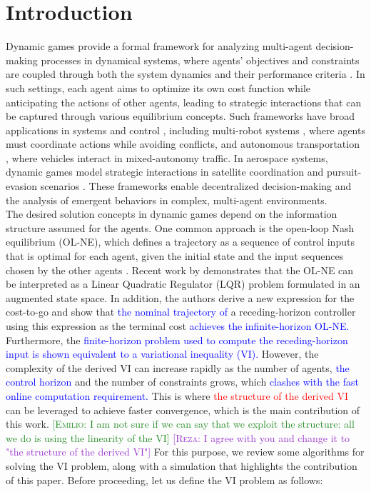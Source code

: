 \documentclass[letterpaper, 10 pt, conference]{ieeeconf}  %
\newcommand{\edit}[1]{\textcolor{blue}{#1}}
\newcommand{\emiliosay}[1]{\textcolor{ForestGreen}{[\textsc{Emilio:} #1]}}
\newcommand{\rezasay}[1]{\textcolor{DarkOrchid}{[\textsc{Reza:} #1]}}
\newcommand{\red}[1]{\textcolor{red}{#1}}
\begin{document}
\section{Introduction}
Dynamic games provide a formal framework for analyzing multi-agent decision-making processes in dynamical systems, where agents' objectives and constraints are coupled through both the system dynamics and their performance criteria \cite{haurie2012games,suzanne2000dynamic,wang2022cooperative}. In such settings, each agent aims to optimize its own cost function while anticipating the actions of other agents, leading to strategic interactions that can be captured through various equilibrium concepts. Such frameworks have broad applications in systems and control \cite{fele2018framework}, including multi-robot systems \cite{hall2024game}, where agents must coordinate actions while avoiding conflicts, and autonomous transportation \cite{kada2020distributed}, where vehicles interact in mixed-autonomy traffic. In aerospace systems, dynamic games model strategic interactions in satellite coordination and pursuit-evasion scenarios \cite{musavi2017unmanned,li2020distributed}. These frameworks enable decentralized decision-making and the analysis of emergent behaviors in complex, multi-agent environments.\\
The desired solution concepts in dynamic games depend on the information structure assumed for the agents. One common approach is the open-loop Nash equilibrium (OL-NE), which defines a trajectory as a sequence of control inputs that is optimal for each agent, given the initial state and the input sequences chosen by the other agents \cite{monti2024feedback,sassano2021constructive}.
Recent work by \cite{benenati2024linear} demonstrates that the OL-NE can be interpreted as a Linear Quadratic Regulator (LQR) problem formulated in an augmented state space. In addition, the authors derive a new expression for the cost-to-go and show that \edit{the nominal trajectory of} a receding-horizon controller using this expression as the terminal cost \edit{achieves the infinite-horizon OL-NE.} Furthermore, the \edit{finite-horizon problem used to compute the receding-horizon input is shown equivalent to a variational inequality (VI).} However, the complexity of the derived VI can increase rapidly as the number of agents, \edit{the control horizon} and the number of constraints grows, which \edit{clashes with the fast online computation requirement.} This is where \red{the structure of the derived VI} can be leveraged to achieve faster convergence, which is the main contribution of this work. \emiliosay{I am not sure if we can say that we exploit the structure: all we do is using the linearity of the VI} \rezasay{I agree with you and change it to "the structure of the derived VI"} For this purpose, we review some algorithms for solving the VI problem, along with a simulation that highlights the contribution of this paper. Before proceeding, let us define the VI problem as follows:
\end{document}
